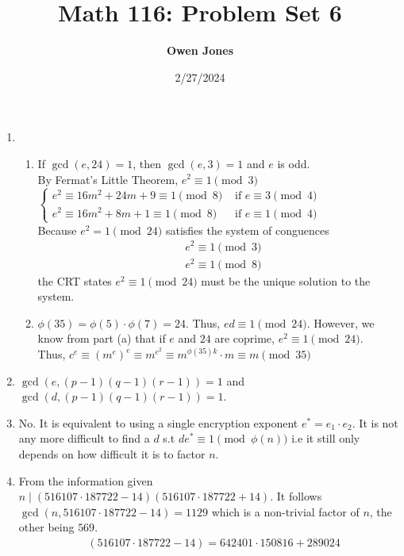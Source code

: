 \documentclass[10pt]{article}
\title{\bf Math 116: Problem Set 6}
\date{2/27/2024}
\author{\bf Owen Jones}
\begin{document}
\maketitle
\begin{enumerate}[label= \arabic*.]
    \item \begin{enumerate}
        \item If $\gcd(e,24)=1$, then $\gcd(e,3)=1$ and $e$ is odd. \\
        By Fermat's Little Theorem, $e^2\equiv 1\pmod{3}$\\
        $\begin{cases}
            e^2\equiv 16m^2+24m+9\equiv 1\pmod{8} & \text{ if }e\equiv 3\pmod{4}\\
            e^2\equiv 16m^2+8m+1\equiv 1\pmod{8} & \text{ if }e\equiv 1\pmod{4}
        \end{cases}$\\
        Because $e^2=1\pmod{24}$ satisfies the system of conguences
        \begin{align*}
            &e^2\equiv 1\pmod{3}\\
            &e^2\equiv 1\pmod{8}
        \end{align*} the CRT states $e^2\equiv 1\pmod{24}$ must be the unique solution to the system.
        \item $\phi(35)=\phi(5)\cdot\phi(7)=24$. 
        Thus, $ed\equiv 1\pmod{24}$.
        However, we know from part (a) that if $e$ and $24$ are coprime, $e^2\equiv 1\pmod{24}$.\\ 
        Thus, $c^e\equiv {(m^e)}^e\equiv m^{e^2}\equiv m^{\phi(35)k}\cdot m\equiv m\pmod{35}$
    \end{enumerate}
    \item $\gcd(e,(p-1)(q-1)(r-1))=1$ and $\gcd(d,(p-1)(q-1)(r-1))=1$.
    \item No. It is equivalent to using a single encryption exponent $e^*=e_1\cdot e_2$. 
    It is not any more difficult to find a $d$ s.t $de^*\equiv 1\pmod{\phi(n)}$ i.e it still only depends on how difficult it is to factor $n$.
    \item From the information given $n\mid (516107\cdot 187722-14)(516107\cdot 187722+14)$. It follows $\gcd(n,516107\cdot 187722-14)=1129$ which is a non-trivial factor of $n$, the other being $569$.\\
    \begin{align*}
        &(516107\cdot 187722-14)=642401\cdot 150816+289024\\

\end{align*}
\end{enumerate}
\end{document}
